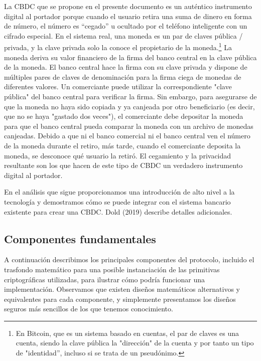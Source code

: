 \documentclass[10pt,spanish]{article}
\begin{document}
La CBDC que se propone en el presente documento es un auténtico
instrumento digital al portador porque cuando el usuario retira una suma
de dinero en forma de número, el número es ``cegado'' u ocultado por el
teléfono inteligente con un cifrado especial. En el sistema real, una
moneda es un par de claves pública / privada, y la clave privada solo la
conoce el propietario de la moneda.\footnote{En Bitcoin, que es un
sistema basado en cuentas, el par de claves es una cuenta, siendo la
clave pública la "dirección" de la cuenta y por tanto un tipo de
"identidad'', incluso si se trata de un pseudónimo.} La moneda deriva
su valor financiero de la firma del banco central en la clave pública de
la moneda. El banco central hace la firma con su clave privada y dispone
de múltiples pares de claves de denominación para la firma ciega de
monedas de diferentes valores. Un comerciante puede utilizar la
correspondiente "clave pública" del banco central para verificar la
firma. Sin embargo, para asegurarse de que la moneda no haya sido
copiada y ya canjeada por otro beneficiario (es decir, que no se haya
"gastado dos veces"), el comerciante debe depositar la moneda para que
el banco central pueda comparar la moneda con un archivo de monedas
canjeadas. Debido a que ni el banco comercial ni el banco central ven el
número de la moneda durante el retiro, más tarde, cuando el comerciante
deposita la moneda, se desconoce qué usuario la retiró. El cegamiento y
la privacidad resultante son los que hacen de este tipo de CBDC un
verdadero instrumento digital al portador.

En el análisis que sigue proporcionamos una introducción de alto nivel a
la tecnología y demostramos cómo se puede integrar con el sistema
bancario existente para crear una CBDC. Dold (2019) describe detalles
adicionales.

\hypertarget{componentes-fundamentales}{%
\subsection{Componentes fundamentales}\label{componentes-fundamentales}}

A continuación describimos los principales componentes del protocolo,
incluido el trasfondo matemático para una posible instanciación de las
primitivas criptográficas utilizadas, para ilustrar cómo podría
funcionar una implementación. Observamos que existen diseños matemáticos
alternativos y equivalentes para cada componente, y simplemente
presentamos los diseños seguros más sencillos de los que tenemos
conocimiento.
\end{document}
